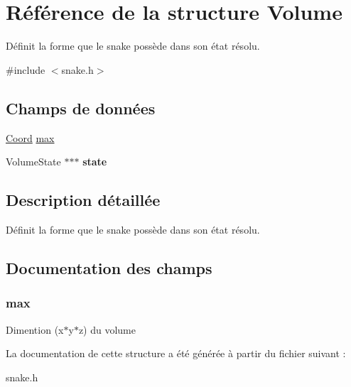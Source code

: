 \hypertarget{struct_volume}{\section{Référence de la structure Volume}
\label{struct_volume}
}


Définit la forme que le snake possède dans son état résolu.  




{\ttfamily \#include $<$snake.\-h$>$}

\subsection*{Champs de données}
\begin{DoxyCompactItemize}
\item 
\hyperlink{struct_coord}{Coord} \hyperlink{struct_volume_aa83862769f78fffb512bc9283007ef67}{max}
\item 
\hypertarget{struct_volume_a96775002e6d2b0c5c4349b77ad4326d2}{Volume\-State $\ast$$\ast$$\ast$ {\bfseries state}}\label{struct_volume_a96775002e6d2b0c5c4349b77ad4326d2}

\end{DoxyCompactItemize}


\subsection{Description détaillée}
Définit la forme que le snake possède dans son état résolu. 

\subsection{Documentation des champs}
\hypertarget{struct_volume_aa83862769f78fffb512bc9283007ef67}{
\subsubsection[{max}]{\setlength{\rightskip}{0pt plus 5cm}max}}\label{struct_volume_aa83862769f78fffb512bc9283007ef67}
Dimention (x$\ast$y$\ast$z) du volume 

La documentation de cette structure a été générée à partir du fichier suivant \-:\begin{DoxyCompactItemize}
\item 
snake.\-h\end{DoxyCompactItemize}
